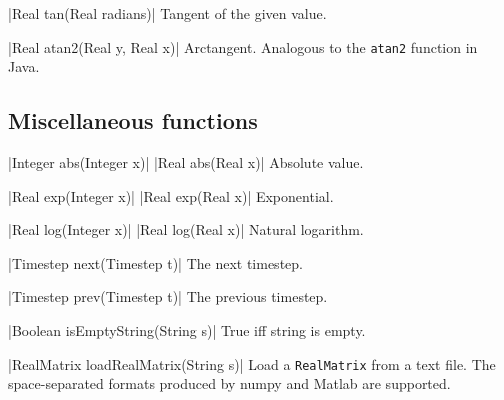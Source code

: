 \blog|Real tan(Real radians)|
\myindent Tangent of the given value.

\blog|Real atan2(Real y, Real x)|
\myindent Arctangent. Analogous to the \verb|atan2| function in Java.


\subsection{Miscellaneous functions}
\label{sec:builtin-misc}

\blog|Integer abs(Integer x)|
\blog|Real abs(Real x)|
\myindent Absolute value.

\blog|Real exp(Integer x)|
\blog|Real exp(Real x)|
\myindent Exponential.

\blog|Real log(Integer x)|
\blog|Real log(Real x)|
\myindent Natural logarithm.

\blog|Timestep next(Timestep t)|
\myindent The next timestep.

\blog|Timestep prev(Timestep t)|
\myindent The previous timestep.

\blog|Boolean isEmptyString(String s)|
\myindent True iff string is empty.

\blog|RealMatrix loadRealMatrix(String s)|
\myindent Load a \verb|RealMatrix| from a text file. The space-separated
formats produced by numpy and Matlab are supported.
